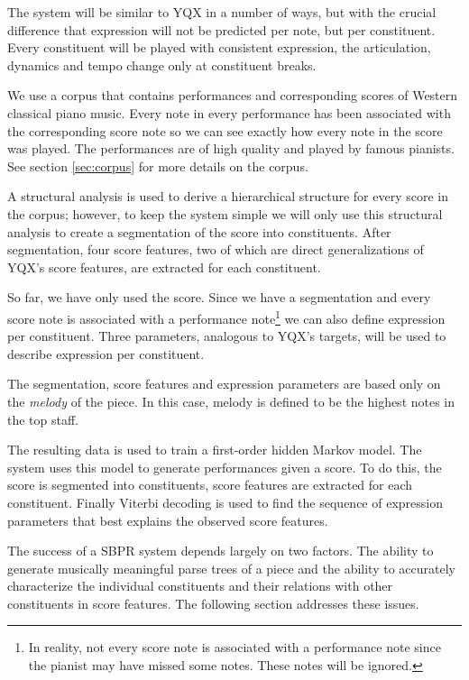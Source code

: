 \documentclass[a4paper,10pt]{article}
\begin{document}

The system will be similar to YQX in a number of ways, but with the crucial difference that expression will not be predicted per note, but per constituent. Every constituent will be played with consistent expression, the articulation, dynamics and tempo change only at constituent breaks.

We use a corpus that contains performances and corresponding scores of Western classical piano music. Every note in every performance has been associated with the corresponding score note so we can see exactly how every note in the score was played. The performances are of high quality and played by famous pianists. See section \ref{sec:corpus} for more details on the corpus.

A structural analysis is used to derive a hierarchical structure for every score in the corpus; however, to keep the system simple we will only use this structural analysis to create a segmentation of the score into constituents. After segmentation, four score features, two of which are direct generalizations of YQX's score features, are extracted for each constituent. 

So far, we have only used the score. Since we have a segmentation and every score note is associated with a performance note\footnote{In reality, not every score note is associated with a performance note since the pianist may have missed some notes. These notes will be ignored.} we can also define expression per constituent. Three parameters, analogous to YQX's targets, will be used to describe expression per constituent.

The segmentation, score features and expression parameters are based only on the \textit{melody} of the piece. In this case, melody is defined to be the highest notes in the top staff.

The resulting data is used to train a first-order hidden Markov model. The system uses this model to generate performances given a score. To do this, the score is segmented into constituents, score features are extracted for each constituent. Finally Viterbi decoding is used to find the sequence of expression parameters that best explains the observed score features.

The success of a SBPR system depends largely on two factors. The ability to generate musically meaningful parse trees of a piece and the ability to accurately characterize the individual constituents and their relations with other constituents in score features. The following section addresses these issues. 
\end{document}
